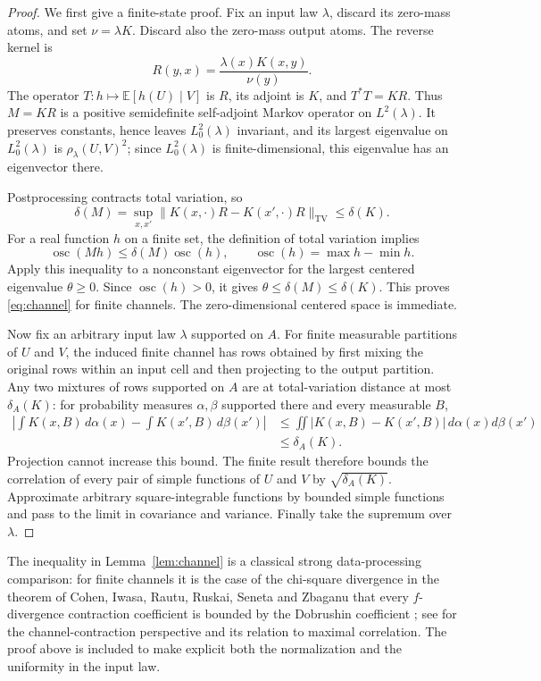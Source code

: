\documentclass[11pt]{amsart}
\numberwithin{equation}{section}
\theoremstyle{definition}
\newcommand{\EE}{\mathbb E}
\newcommand{\TV}{\mathrm{TV}}
\newcommand{\osc}{\operatorname{osc}}
\begin{document}
\begin{proof}
We first give a finite-state proof. Fix an input law $\lambda$, discard its zero-mass atoms, and set $\nu=\lambda K$. Discard also the zero-mass output atoms. The reverse kernel is
\[
R(y,x)=\frac{\lambda(x)K(x,y)}{\nu(y)}.
\]
The operator $T:h\mapsto\EE[h(U)\mid V]$ is $R$, its adjoint is $K$, and $T^*T=KR$. Thus $M=KR$ is a positive semidefinite self-adjoint Markov operator on $L^2(\lambda)$. It preserves constants, hence leaves $L^2_0(\lambda)$ invariant, and its largest eigenvalue on $L^2_0(\lambda)$ is $\rho_\lambda(U,V)^2$; since $L^2_0(\lambda)$ is finite-dimensional, this eigenvalue has an eigenvector there.

Postprocessing contracts total variation, so
\[
\delta(M)=\sup_{x,x'}\|K(x,\cdot)R-K(x',\cdot)R\|_{\TV}
\le\delta(K).
\]
For a real function $h$ on a finite set, the definition of total variation implies
\[
\osc(Mh)\le\delta(M)\osc(h),\qquad
\osc(h)=\max h-\min h.
\]
Apply this inequality to a nonconstant eigenvector for the largest centered eigenvalue $\theta\ge0$. Since $\osc(h)>0$, it gives $\theta\le\delta(M)\le\delta(K)$. This proves \eqref{eq:channel} for finite channels. The zero-dimensional centered space is immediate.

Now fix an arbitrary input law $\lambda$ supported on $A$. For finite measurable partitions of $U$ and $V$, the induced finite channel has rows obtained by first mixing the original rows within an input cell and then projecting to the output partition. Any two mixtures of rows supported on $A$ are at total-variation distance at most $\delta_A(K)$: for probability measures $\alpha,\beta$ supported there and every measurable $B$,
\begin{align*}
\left|\int K(x,B)\,d\alpha(x)-\int K(x',B)\,d\beta(x')\right|
&\le\iint|K(x,B)-K(x',B)|\,d\alpha(x)d\beta(x')\\
&\le\delta_A(K).
\end{align*}
Projection cannot increase this bound. The finite result therefore bounds the correlation of every pair of simple functions of $U$ and $V$ by $\sqrt{\delta_A(K)}$. Approximate arbitrary square-integrable functions by bounded simple functions and pass to the limit in covariance and variance. Finally take the supremum over $\lambda$.
\end{proof}

The inequality in Lemma~\ref{lem:channel} is a classical strong data-processing comparison: for finite channels it is the case of the chi-square divergence in the theorem of Cohen, Iwasa, Rautu, Ruskai, Seneta and Zbaganu that every $f$-divergence contraction coefficient is bounded by the Dobrushin coefficient \cite{Cohen1993}; see \cite{PolyanskiyWu2017} for the channel-contraction perspective and its relation to maximal correlation. The proof above is included to make explicit both the normalization and the uniformity in the input law.
\end{document}
